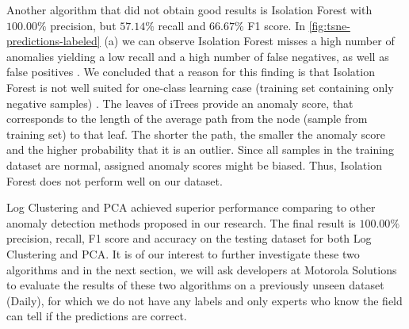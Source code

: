 Another algorithm that did not obtain good results is Isolation Forest with $100.00\%$ precision, but $57.14\%$ recall and $66.67\%$ F1 score. In \ref{fig:tsne-predictions-labeled} (a) we can observe Isolation Forest misses a high number of anomalies yielding a low recall and a high number of false negatives, as well as false positives . We concluded that a reason for this finding is that Isolation Forest is not well suited for one-class learning case (training set containing only negative samples) \cite{adForest}. The leaves of iTrees provide an anomaly score, that corresponds to the length of the average path from the node (sample from training set) to that leaf. The shorter the path, the smaller the anomaly score and the higher probability that it is an outlier. Since all samples in the training dataset are normal, assigned anomaly scores might be biased. Thus, Isolation Forest does not perform well on our dataset.

Log Clustering and PCA achieved superior performance comparing to other anomaly detection methods proposed in our research. The final result is $100.00\%$ precision, recall, F1 score and accuracy on the testing dataset for both Log Clustering and PCA. It is of our interest to further investigate these two algorithms and in the next section, we will ask developers at Motorola Solutions to evaluate the results of these two algorithms on a previously unseen dataset (Daily), for which we do not have any labels and only experts who know the field can tell if the predictions are correct. 

